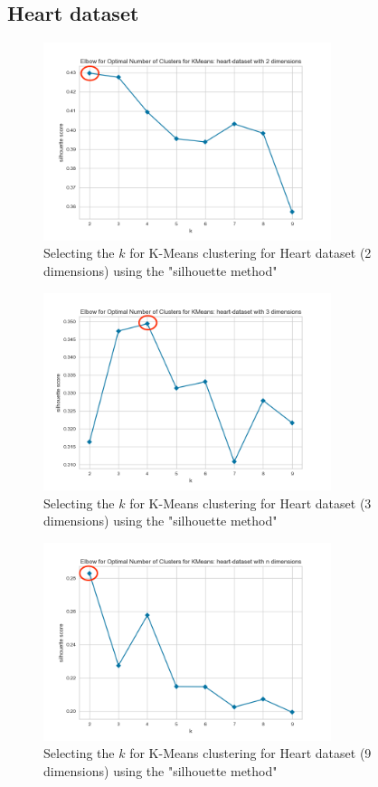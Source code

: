 \subsection{Heart dataset}
\begin{figure}[H]
  \includegraphics[width=0.75\textwidth]{Method/images/k-values/heart-dataset-2-kmeans.png}
  \caption{Selecting the $k$ for K-Means clustering for Heart dataset (2 dimensions) using the "silhouette method"}
  \label{hyperparameters:agglomerative-heart-dataset-2d}
\end{figure}
\begin{figure}[H]
  \includegraphics[width=0.75\textwidth]{Method/images/k-values/heart-dataset-3-kmeans.png}
  \caption{Selecting the $k$ for K-Means clustering for Heart dataset (3 dimensions) using the "silhouette method"}
  \label{hyperparameters:agglomerative-heart-dataset-3d}
\end{figure}
\begin{figure}[H]
  \includegraphics[width=0.75\textwidth]{Method/images/k-values/heart-dataset-n-kmeans.png}
  \caption{Selecting the $k$ for K-Means clustering for Heart dataset (9 dimensions) using the "silhouette method"}
  \label{hyperparameters:agglomerative-heart-dataset-9d}
\end{figure}
\newpage

